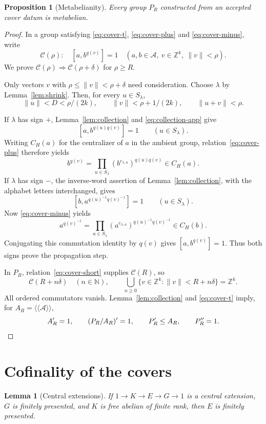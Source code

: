 \documentclass[12pt]{article}
\numberwithin{equation}{section}
\newtheorem{proposition}[theorem]{Proposition}
\newtheorem{lemma}[theorem]{Lemma}
\theoremstyle{definition}
\theoremstyle{remark}
\newcommand{\Z}{\mathbb Z}
\newcommand{\N}{\mathbb N}
\newcommand{\nc}[1]{\langle\!\langle #1\rangle\!\rangle}
\newcommand{\norm}[1]{\lVert #1\rVert}
\begin{document}
\begin{proposition}[Metabelianity]
\label{prop:sound}
Every group $P_R$ constructed from an accepted cover datum is metabelian.
\end{proposition}

\begin{proof}
In a group satisfying \eqref{eq:cover-t}, \eqref{eq:cover-plus} and
\eqref{eq:cover-minus}, write
\[
 \mathcal C(\rho):\quad
 [a,b^{q(v)}]=1\quad
 (a,b\in\mathcal A,\ v\in\Z^k,\ \norm v<\rho).
\]
We prove $\mathcal C(\rho)\Rightarrow\mathcal C(\rho+\delta)$ for $\rho\ge R$.

Only vectors $v$ with $\rho\le\norm v<\rho+\delta$ need consideration.
Choose $\lambda$ by Lemma~\ref{lem:shrink}. Then, for every
$u\in S_\lambda$,
\begin{equation}
\label{eq:collection-app}
 \norm u<D<\rho/(2k),\qquad
 \norm v<\rho+1/(2k),\qquad
 \norm{u+v}<\rho.
\end{equation}

If $\lambda$ has sign $+$, Lemma~\ref{lem:collection} and
\eqref{eq:collection-app} give
\[
 [a,b^{q(u)q(v)}]=1\qquad(u\in S_\lambda).
\]
Writing $C_H(a)$ for the centralizer of $a$ in the ambient group,
relation~\eqref{eq:cover-plus} therefore yields
\[
 b^{q(v)}
 =\prod_{u\in S_\lambda}(b^{c_{\lambda,u}})^{q(u)q(v)}
 \in C_H(a).
\]
If $\lambda$ has sign $-$, the inverse-word assertion of
Lemma~\ref{lem:collection}, with the alphabet letters interchanged, gives
\[
 [b,a^{q(u)^{-1}q(v)^{-1}}]=1\qquad(u\in S_\lambda).
\]
Now \eqref{eq:cover-minus} yields
\[
 a^{q(v)^{-1}}
 =\prod_{u\in S_\lambda}(a^{c_{\lambda,u}})^{q(u)^{-1}q(v)^{-1}}
 \in C_H(b).
\]
Conjugating this commutation identity by $q(v)$ gives
$[a,b^{q(v)}]=1$. Thus both signs prove the propagation step.

In $P_R$, relation~\eqref{eq:cover-short} supplies $\mathcal C(R)$, so
\[
 \mathcal C(R+n\delta)\quad(n\in\N),\qquad
 \bigcup_{n\ge0}\{v\in\Z^k:\norm v<R+n\delta\}=\Z^k.
\]
All ordered commutators vanish. Lemma~\ref{lem:collection} and
\eqref{eq:cover-t} imply, for $A_R=\nc{\mathcal A}$,
\[
 A_R'=1,\qquad (P_R/A_R)'=1,\qquad
 P_R'\le A_R,\qquad P_R''=1.\qedhere
\]
\end{proof}

\section{Cofinality of the covers}
\label{sec:cofinality}

\begin{lemma}[Central extensions]
\label{lem:central}
If $1\to K\to E\to G\to1$ is a central extension, $G$ is finitely
presented, and $K$ is free abelian of finite rank, then $E$ is finitely
presented.
\end{lemma}
\end{document}
